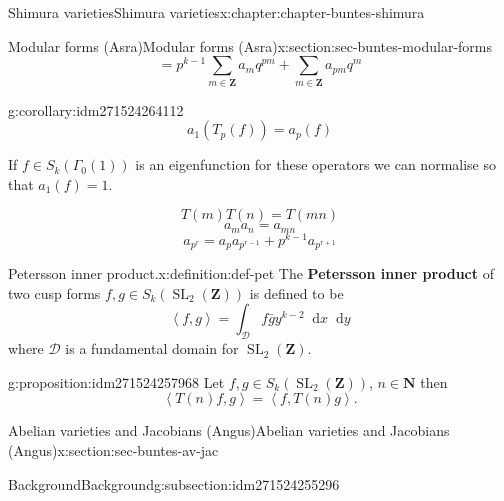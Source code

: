 \documentclass[oneside,10pt,]{book}
\newcommand{\terminology}[1]{\textbf{#1}}
\numberwithin{equation}{section}
\newcommand{\diff}{\mathop{}\!\mathrm{d}}
\newcommand{\pair}[2]{\left\langle #1, #2 \right\rangle}
\newcommand{\NN}{\mathbf{N}}
\newcommand{\ZZ}{\mathbf{Z}}
\DeclareMathOperator{\SL}{SL}
\begin{document}
\begin{chapterptx}{Shimura varieties}{}{Shimura varieties}{}{}{x:chapter:chapter-buntes-shimura}
\begin{sectionptx}{Modular forms (Asra)}{}{Modular forms (Asra)}{}{}{x:section:sec-buntes-modular-forms}
\begin{equation*}
\end{equation*}
%
\begin{equation*}
= p^{k-1} \sum_{m\in \ZZ} a_m q^{pm} +\sum_{m\in \ZZ} a_{pm}q^m
\end{equation*}
%
\begin{corollary}{}{}{g:corollary:idm271524264112}%
%
\begin{equation*}
a_1(T_p(f)) = a_p(f)
\end{equation*}
%
\end{corollary}
If \(f\in S_k(\Gamma_0(1))\) is an eigenfunction for these operators we can normalise so that \(a_1(f) = 1\).%
\par
%
\begin{equation*}
T(m)T(n) = T(mn)
\end{equation*}
%
\begin{equation*}
a_ma_n = a_{mn}
\end{equation*}
%
\begin{equation*}
a_{p^r} = a_p a_{p^{r-1}} + p^{k-1} a_{p^{r+1}}
\end{equation*}
%
\begin{definition}{Petersson inner product.}{x:definition:def-pet}%
The \terminology{Petersson inner product} of two cusp forms \(f,g\in S_k(\SL_2(\ZZ))\) is defined to be%
\begin{equation*}
\pair{f}{g} = \int_{\mathcal D} f \bar g y^{k-2} \diff x \diff y
\end{equation*}
where \(\mathcal D\) is a fundamental domain for \(\SL_2(\ZZ)\).%
\end{definition}
\begin{proposition}{}{}{g:proposition:idm271524257968}%
Let \(f,g\in S_k(\SL_2(\ZZ))\), \(n\in \NN\) then%
\begin{equation*}
\pair{T(n) f}{g} = \pair{f}{T(n)g}\text{.}
\end{equation*}
%
\end{proposition}
\end{sectionptx}
%
%
\typeout{************************************************}
\typeout{************************************************}
%
\begin{sectionptx}{Abelian varieties and Jacobians (Angus)}{}{Abelian varieties and Jacobians (Angus)}{}{}{x:section:sec-buntes-av-jac}
%
%
\typeout{************************************************}
\typeout{************************************************}
%
\begin{subsectionptx}{Background}{}{Background}{}{}{g:subsection:idm271524255296}

\end{subsectionptx}
\end{sectionptx}
\end{chapterptx}
\end{document}
